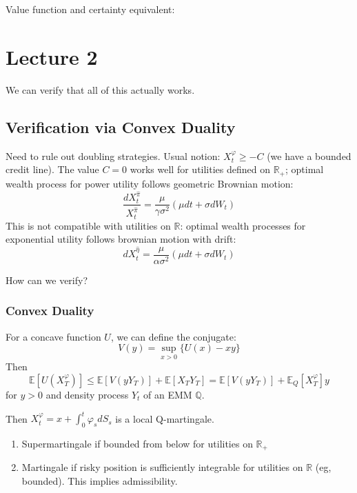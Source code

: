 Value function and certainty equivalent:

\chapter{Lecture 2}
We can verify that all of this actually works.

\section{Verification via Convex Duality}
Need to rule out doubling strategies.
Usual notion: $X^\varphi_t \geq -C$ (we have a bounded credit line).
The value $C=0$ works well for utilities defined on $\mathbb{R}_+$; optimal wealth process for power utility follows geometric Brownian motion:
\begin{equation}
	\frac{dX_t^{\hat{\pi}}}{X_t^{\hat{\pi}}} = \frac{\mu}{\gamma \sigma^2} (\mu dt + \sigma dW_t)
\end{equation}
This is not compatible with utilities on $\mathbb{R}$: optimal wealth processes for exponential utility follows brownian motion with drift:
\begin{equation}
	dX_t^{\hat{\eta}} = \frac{\mu}{\alpha \sigma^2} (\mu dt + \sigma dW_t)
\end{equation}

How can we verify?

\subsection{Convex Duality}
For a concave function $U$, we can define the conjugate:
\begin{equation}
	V(y) = \sup_{x > 0} \{ U(x) - xy \}
\end{equation}
Then
\begin{equation}
	\mathbb{E}\left[ U(X^\varphi_T) \right] \leq 
	\mathbb{E}\left[ V(yY_T) \right] + \mathbb{E}\left[ X_TY_T \right]
	= \mathbb{E}\left[ V(yY_T) \right] + \mathbb{E}_Q\left[ X_T^\varphi \right]y
\end{equation}
for $y>0$ and density process $Y_t$ of an EMM $\mathbb{Q}$.

Then $X_t^\varphi = x + \int_0^t \varphi_s dS_s$ is a local Q-martingale.
\begin{enumerate}
	\item Supermartingale if bounded from below for utilities on $\mathbb{R}_+$
	\item Martingale if risky position is sufficiently integrable for utilities on $\mathbb{R}$ (eg, bounded). This implies admissibility.
\end{enumerate}

